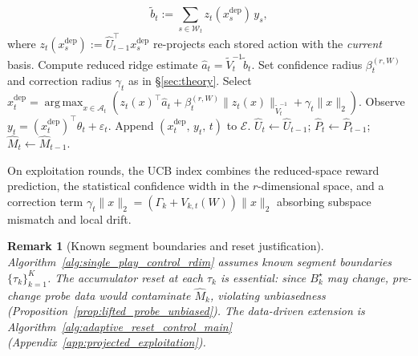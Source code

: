 \documentclass{article}
\newcommand{\cA}{\mathcal{A}}
\DeclareMathOperator*{\argmax}{arg\,max}
\newtheorem{remark}{Remark}
\begin{document}
\begin{algorithm}[!htpb]
\begin{algorithmic}[1]
\[              \widetilde b_t
              :=
              \sum_{s\in\mathcal W_t}
                z_t(x_s^{\mathrm{dep}})\, y_s,
          \]
          where $z_t(x_s^{\mathrm{dep}}) := \widehat U_{t-1}^\top x_s^{\mathrm{dep}}$
          re-projects each stored action with the \emph{current} basis.
          \State Compute reduced ridge estimate $\widehat a_t = \widetilde V_t^{-1}\widetilde b_t$.
          \State Set confidence radius $\beta_t^{(r,W)}$ and correction radius $\gamma_t$
                 as in \S\ref{sec:theory}.
          \State Select
          $x_t^{\mathrm{dep}}
              =
              \argmax_{x \in \cA_t}
              \!\left(
              z_t(x)^\top \widehat a_t
              +
              \beta_t^{(r,W)} \|z_t(x)\|_{\widetilde V_t^{-1}}
              +
              \gamma_t \|x\|_2
              \right)$.
          \State Observe $y_t = (x_t^{\mathrm{dep}})^\top \theta_t + \varepsilon_t$.
          \State Append $(x_t^{\mathrm{dep}},\, y_t,\, t)$ to $\mathcal{E}$.
          \State $\widehat U_t \leftarrow \widehat U_{t-1}$;\;
                 $\widehat P_t \leftarrow \widehat P_{t-1}$;\;
                 $\widehat M_t \leftarrow \widehat M_{t-1}$.
      \EndIf
  \EndFor
  \end{algorithmic}
\end{algorithm}

On exploitation rounds, the UCB index combines the reduced-space reward prediction, the statistical confidence width in the $r$-dimensional space, and a correction term $\gamma_t \|x\|_2 = (\Gamma_k + V_{k,t}(W))\|x\|_2$ absorbing subspace mismatch and local drift.

\begin{remark}[Known segment boundaries and reset justification]
\label{rem:reset_justification}
Algorithm~\ref{alg:single_play_control_rdim} assumes known segment boundaries $\{\tau_k\}_{k=1}^K$. The accumulator reset at each $\tau_k$ is essential: since $B_k^\star$ may change, pre-change probe data would contaminate $\widehat M_k$, violating unbiasedness (Proposition~\ref{prop:lifted_probe_unbiased}). The data-driven extension is Algorithm~\ref{alg:adaptive_reset_control_main} (Appendix~\ref{app:projected_exploitation}).
\end{remark}
\end{document}

